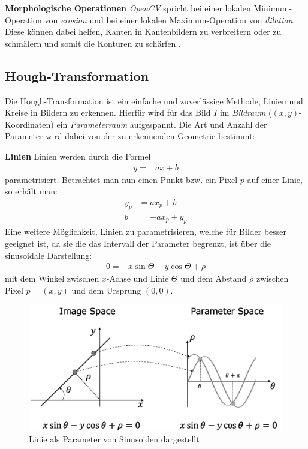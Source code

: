 \textbf{Morphologische Operationen} \textit{OpenCV} spricht bei einer lokalen Minimum-Operation von \textit{erosion} und bei einer lokalen Maximum-Operation von \textit{dilation}. Diese können dabei helfen, Kanten in Kantenbildern zu verbreitern oder zu schmälern und somit die Konturen zu \dq schärfen \dq \cite{learning_opencv}.

\subsection{Hough-Transformation}
Die Hough-Transformation ist ein einfache und zuverlässige Methode, Linien und Kreise in Bildern  zu erkennen. Hierfür wird für das Bild $I$ im \textit{Bildraum} ($(x,y)$-Koordinaten) ein \textit{Parameterraum} aufgespannt. Die Art und Anzahl der Parameter wird dabei von der zu erkennenden Geometrie bestimmt:

\textbf{Linien} Linien werden durch die Formel
\begin{align}
    y = & ax+b
\end{align}
parametrisiert. Betrachtet man nun einen Punkt bzw. ein Pixel $p$ auf einer Linie, so erhält man:
\begin{align}
    y_p & = ax_p + b\\
    b & = -ax_p + y_p
\end{align}
Eine weitere Möglichkeit, Linien zu parametrisieren, welche für Bilder besser geeignet ist, da sie die das Intervall der Parameter begrenzt, ist über die sinusoidale Darstellung:
\begin{align}
    0 = & x \sin \Theta - y \cos \Theta + \rho
\end{align}
mit dem Winkel zwischen $x$-Achse und Linie $\Theta$ und dem Abstand $\rho$ zwischen Pixel $p = (x,y)$ und dem Ursprung $(0,0)$.

\begin{figure}[htbp]
    \centering
    \includegraphics[width=12cm]{bilder/hough_line_space.png}
    \caption[Parameterraum Linie Sinusoid]{Linie als Parameter von Sinusoiden dargestellt \cite{nayar_boundary_detection}}
    \label{fig:hough_line_space}
\end{figure}

